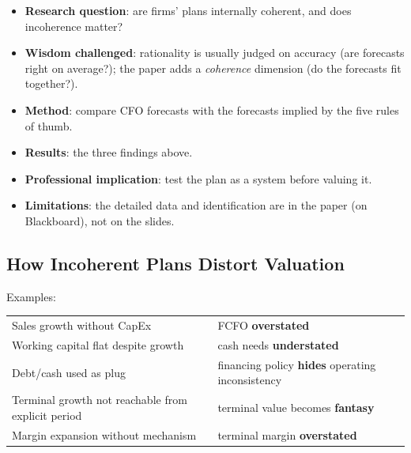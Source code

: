 \begin{addbox}
\begin{itemize}[leftmargin=*]
  \item \textbf{Research question}: are firms' plans internally coherent, and does incoherence matter?
  \item \textbf{Wisdom challenged}: rationality is usually judged on accuracy (are forecasts right on average?); the paper adds a \emph{coherence} dimension (do the forecasts fit together?).
  \item \textbf{Method}: compare CFO forecasts with the forecasts implied by the five rules of thumb.
  \item \textbf{Results}: the three findings above.
  \item \textbf{Professional implication}: test the plan as a system before valuing it.
  \item \textbf{Limitations}: the detailed data and identification are in the paper (on Blackboard), not on the slides.
\end{itemize}
\end{addbox}

\subsection{How Incoherent Plans Distort Valuation}

\begin{center}
\end{center}
Examples:
\begin{center}
\small
\begin{tabular}{@{}l@{$\;\longrightarrow\;$}l@{}}
Sales growth without CapEx & FCFO \textbf{overstated}\\
Working capital flat despite growth & cash needs \textbf{understated}\\
Debt/cash used as plug & financing policy \textbf{hides} operating inconsistency\\
Terminal growth not reachable from explicit period & terminal value becomes \textbf{fantasy}\\
Margin expansion without mechanism & terminal margin \textbf{overstated}\\
\end{tabular}
\end{center}

